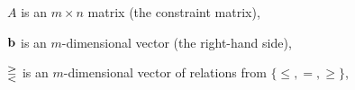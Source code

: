 \item $A$ is an $m\times n$ matrix (the constraint matrix), 
\item $\mathbf{b}$ is an $m$-dimensional vector (the right-hand side),
\item $\gtreqless$ is an $m$-dimensional vector of relations 
from $\{\leq, =, \geq\}$, 

